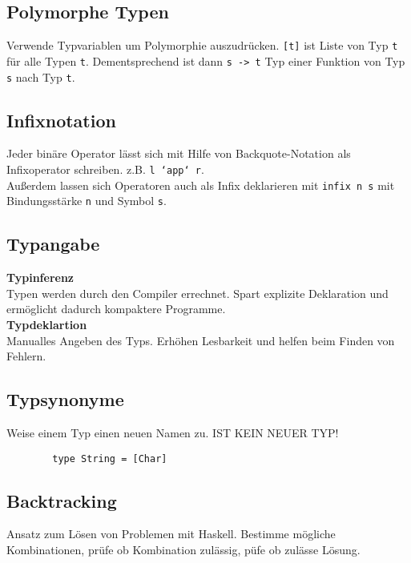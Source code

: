 \documentclass[10pt,a4paper,draft]{article}
\def\code#1{\texttt{#1}}
\begin{document}
        \subsection{Polymorphe Typen}
        Verwende Typvariablen um Polymorphie auszudrücken.
        \code{[t]} ist Liste von Typ \code{t} für alle Typen \code{t}.
        Dementsprechend ist dann \code{s -> t} Typ einer Funktion von Typ \code{s} nach Typ \code{t}.

        \subsection{Infixnotation}
        Jeder binäre Operator lässt sich mit Hilfe von Backquote-Notation als Infixoperator schreiben.
        z.B. \code{l `app` r}.\\
        Außerdem lassen sich Operatoren auch als Infix deklarieren mit \code{infix n s} mit Bindungsstärke \code{n} und Symbol \code{s}.

        \subsection{Typangabe}
        \textbf{Typinferenz}\\
        Typen werden durch den Compiler errechnet. Spart explizite Deklaration und ermöglicht dadurch kompaktere Programme.\\
        \textbf{Typdeklartion}\\
        Manualles Angeben des Typs. Erhöhen Lesbarkeit und helfen beim Finden von Fehlern.

        \subsection{Typsynonyme}
        Weise einem Typ einen neuen Namen zu. IST KEIN NEUER TYP!
        \begin{lstlisting}
        type String = [Char]
       \end{lstlisting}

        \subsection{Backtracking}
        Ansatz zum Lösen von Problemen mit Haskell.
        Bestimme mögliche Kombinationen, prüfe ob Kombination zulässig, püfe ob zulässe Lösung.
\end{document}
